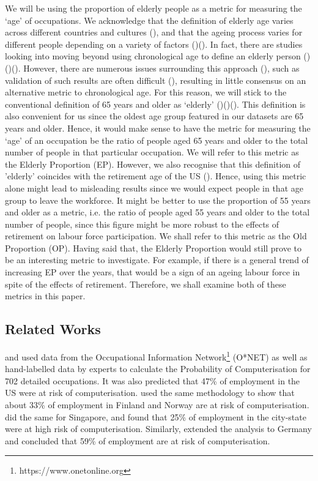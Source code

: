 \documentclass[11pt]{article}
\begin{document}
We will be using the proportion of elderly people as a metric for measuring the `age' of occupations. We acknowledge that the definition of elderly age varies across different countries and cultures (\cite{ageingculture}), and that the ageing process varies for different people depending on a variety of factors (\cite{levine2013modeling})(\cite{hayflick2007biological}). In fact, there are studies looking into moving beyond using chronological age to define an elderly person (\cite{KotterGrhn2015})(\cite{SOTOPEREZDECELIS2018e305})(\cite{klemera2006new}). However, there are numerous issues surrounding this approach (\cite{jylhava2017biological}), such as validation of such results are often difficult (\cite{biologicalagedifficult}), resulting in little consensus on an alternative metric to chronological age. For this reason, we will stick to the conventional definition of 65 years and older as `elderly' (\cite{who2010definition})(\cite{orimo2006reviewing})(\cite{oecddata}). This definition is also convenient for us since the oldest age group featured in our datasets are 65 years and older. Hence, it would make sense to have the metric for measuring the `age' of an occupation be the ratio of people aged 65 years and older to the total number of people in that particular occupation. We will refer to this metric as the Elderly Proportion (EP). However, we also recognise that this definition of 'elderly' coincides with the retirement age of the US (\cite{MunnellAliciaH2013SSRR}). Hence, using this metric alone might lead to misleading results since we would expect people in that age group to leave the workforce. It might be better to use the proportion of 55 years and older as a metric, i.e. the ratio of people aged 55 years and older to the total number of people, since this figure might be more robust to the effects of retirement on labour force participation. We shall refer to this metric as the Old Proportion (OP). Having said that, the Elderly Proportion would still prove to be an interesting metric to investigate. For example, if there is a general trend of increasing EP over the years, that would be a sign of an ageing labour force in spite of the effects of retirement. Therefore, we shall examine both of these metrics in this paper.

\subsection*{Related Works}

\cite{futureofemployment} and \cite{osborne2017future} used data from the Occupational Information Network\footnote{https://www.onetonline.org} (O*NET) as well as hand-labelled data by experts to calculate the Probability of Computerisation for 702 detailed occupations. It was also predicted that 47\% of employment in the US were at risk of computerisation. \cite{pajarinen2015computerization} used the same methodology to show that about 33\% of employment in Finland and Norway are at risk of computerisation. \cite{fuei2017automation} did the same for Singapore, and found that 25\% of employment in the city-state were at high risk of computerisation. Similarly, \cite{brzeski2015roboter} extended the analysis to Germany and concluded that 59\% of employment are at risk of computerisation.
\end{document}
